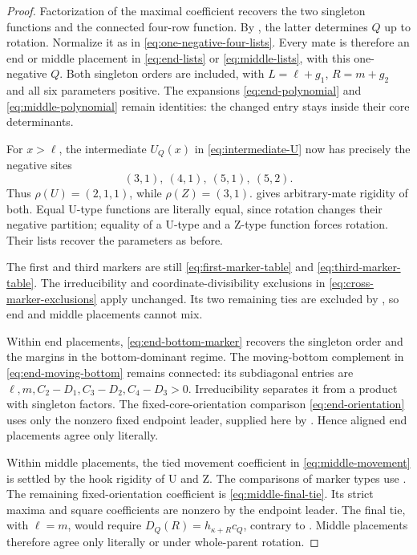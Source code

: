 \documentclass[11pt,a4paper]{amsart}
\numberwithin{equation}{section}
\theoremstyle{plain}
\theoremstyle{definition}
\begin{document}
\begin{proof}
Factorization of the maximal coefficient recovers the two singleton
functions and the connected four-row function.  By
, the latter determines \(Q\) up to rotation.
Normalize it as in \eqref{eq:one-negative-four-lists}.
Every mate is therefore an end or middle placement in
\eqref{eq:end-lists} or \eqref{eq:middle-lists}, with this one-negative
\(Q\).  Both singleton orders are included, with \(L=\ell+g_1\), \(R=m+g_2\)
and all six parameters positive.  The expansions
\eqref{eq:end-polynomial} and \eqref{eq:middle-polynomial} remain
identities: the changed entry stays inside their core determinants.

For \(x>\ell\), the intermediate \(U_Q(x)\) in
\eqref{eq:intermediate-U} now has precisely the negative sites
\[
 (3,1),\ (4,1),\ (5,1),\ (5,2).
\]
Thus \(\rho(U)=(2,1,1)\), while \(\rho(Z)=(3,1)\).
 gives arbitrary-mate rigidity of both.  Equal
U-type functions are literally equal, since rotation changes their
negative partition; equality of a U-type and a Z-type function forces
rotation.  Their lists recover the parameters as before.

The first and third markers are still
\eqref{eq:first-marker-table} and \eqref{eq:third-marker-table}.
The irreducibility and coordinate-divisibility exclusions in
\eqref{eq:cross-marker-exclusions} apply unchanged.  Its two remaining
ties are excluded by , so end and
middle placements cannot mix.

Within end placements, \eqref{eq:end-bottom-marker} recovers the
singleton order and the margins in the bottom-dominant regime.  The
moving-bottom complement in \eqref{eq:end-moving-bottom} remains
connected: its subdiagonal entries are
\(\ell,m,C_2-D_1,C_3-D_2,C_4-D_3>0\).
Irreducibility separates it from a product with singleton factors.
The fixed-core-orientation comparison \eqref{eq:end-orientation} uses
only the nonzero fixed endpoint leader, supplied here by
.  Hence aligned end placements agree
only literally.

Within middle placements, the tied movement coefficient in
\eqref{eq:middle-movement} is settled by the hook rigidity of U and Z.
The comparisons of marker types use
.  The remaining fixed-orientation
coefficient is \eqref{eq:middle-final-tie}.  Its strict maxima and square
coefficients are nonzero by the endpoint leader.  The final tie, with
\(\ell=m\), would require
\(D_Q(R)=h_{\kappa+R}c_Q\), contrary to
.  Middle placements therefore agree
only literally or under whole-parent rotation.
\end{proof}
\end{document}
